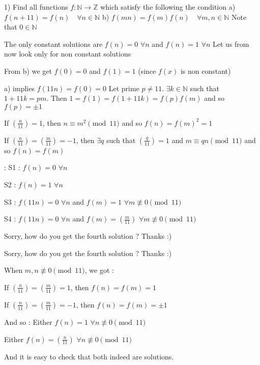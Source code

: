 \begin{solution}
	\begin{tcolorbox}1) Find all functions $f:\mathbb{N}\to\mathbb{Z}$ which satisfy the following the condition 
a) $f(n+11)=f(n) \quad \forall n \in \mathbb{N}$
b) $f(mn)=f(m)f(n) \quad \forall m,n \in \mathbb{N}$
Note that $0 \in \mathbb{N}$\end{tcolorbox}
The only constant solutions are $f(n)=0$ $\forall n$ and $f(n)=1$ $\forall n$
Let us from now look only for non constant solutions

From b) we get $f(0)=0$ and $f(1)=1$ (since $f(x)$ is non constant)

a) implies $f(11n)=f(0)=0$
Let prime $p\ne 11$. $\exists k\in\mathbb N$ such that $1+11k=pm$. Then $1=f(1)=f(1+11k)=f(p)f(m)$ and so $f(p)=\pm 1$

If $\left(\frac n{11}\right)=1$, then $n\equiv m^2\pmod{11}$ and so $f(n)=f(m)^2=1$

If $\left(\frac n{11}\right)=\left(\frac m{11}\right)=-1$, then $\exists q$ such that $\left(\frac q{11}\right)=1$ and $m\equiv qn\pmod {11}$ and so $f(n)=f(m)$

 :
S1 : $f(n)=0$ $\forall n$

S2 : $f(n)=1$ $\forall n$

S3 : $f(11n)=0$ $\forall n$ and $f(m)=1$ $\forall m\not\equiv 0\pmod{11}$

S4 : $f(11n)=0$ $\forall n$ and $f(m)=\left(\frac m{11}\right)$  $\forall m\not\equiv 0\pmod{11}$
\end{solution}



\begin{solution}
	Sorry, how do you get the fourth solution ? Thanks :)
\end{solution}



\begin{solution}
	\begin{tcolorbox}Sorry, how do you get the fourth solution ? Thanks :)\end{tcolorbox}
When $m,n\not\equiv 0\pmod{11}$, we got :

If $\left(\frac n{11}\right)=\left(\frac m{11}\right)=1$, then $f(n)=f(m)=1$

If $\left(\frac n{11}\right)=\left(\frac m{11}\right)=-1$, then $f(n)=f(m)=\pm 1$

And so :
Either $f(n)=1$ $\forall n\not\equiv 0\pmod{11}$

Either $f(n)=\left(\frac n{11}\right)$ $\forall n\not\equiv 0\pmod{11}$

And it is easy to check that both indeed are solutions.
\end{solution}



